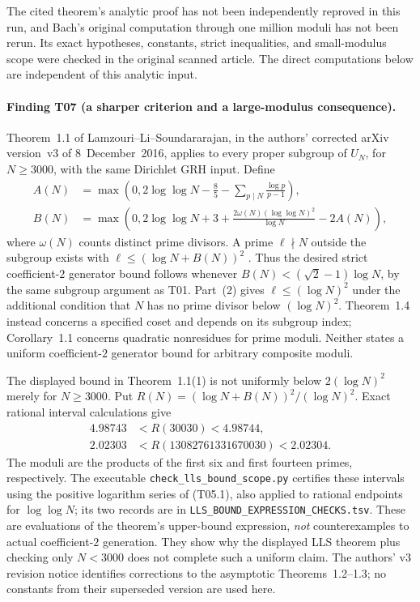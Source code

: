 \documentclass[11pt,a4paper]{article}
\begin{document}
The cited theorem's analytic proof has not been independently reproved
in this run, and Bach's original computation through one million moduli
has not been rerun. Its exact hypotheses, constants, strict inequalities,
and small-modulus scope were checked in the original scanned article.
The direct computations below are independent of this analytic input.

\paragraph{Finding T07 (a sharper criterion and a large-modulus consequence).}
Theorem~1.1 of Lamzouri--Li--Soundararajan, in the authors' corrected
arXiv version~v3 of 8~December~2016, applies to every proper subgroup
of $U_N$, for $N\geq3000$, with the same Dirichlet GRH input.
Define
\[
 \begin{split}
 A(N)&=\max\left(0,2\log\log N-\frac85
                    -\sum_{p\mid N}\frac{\log p}{p-1}\right),\\
 B(N)&=\max\left(0,2\log\log N+3
          +\frac{2\omega(N)(\log\log N)^2}{\log N}-2A(N)\right),
 \end{split}
\]
where $\omega(N)$ counts distinct prime divisors. A prime $\ell\nmid N$
outside the subgroup exists with
$\ell\leq(\log N+B(N))^2$
\cite[Theorem~1.1(1), corrected arXiv version~v3]{LLS2015}.
Thus the desired strict coefficient-$2$ generator bound follows
whenever $B(N)<(\sqrt2-1)\log N$, by the same subgroup argument as
T01. Part~(2) gives $\ell\leq(\log N)^2$ under the additional
condition that $N$ has no prime divisor below $(\log N)^2$.
Theorem~1.4 instead concerns a specified coset and depends on its
subgroup index; Corollary~1.1 concerns quadratic nonresidues for prime
moduli. Neither states a uniform coefficient-$2$ generator bound for
arbitrary composite moduli.

The displayed bound in Theorem~1.1(1) is not uniformly below
$2(\log N)^2$ merely for $N\geq3000$. Put
$R(N)=(\log N+B(N))^2/(\log N)^2$. Exact rational interval calculations
give
\[
 \begin{split}
 4.98743&<R(30030)<4.98744,\\
 2.02303&<R(13082761331670030)<2.02304.
 \end{split}
\]
The moduli are the products of the first six and first fourteen primes,
respectively. The executable \texttt{check\_lls\_bound\_scope.py}
certifies these intervals using the positive logarithm series of
(T05.1), also applied to rational endpoints for $\log\log N$;
its two records are in \texttt{LLS\_BOUND\_EXPRESSION\_CHECKS.tsv}.
These are evaluations of the theorem's upper-bound expression,
\emph{not} counterexamples to actual coefficient-$2$ generation.
They show why the displayed LLS theorem plus checking only $N<3000$
does not complete such a uniform claim. The authors' v3 revision notice
identifies corrections to the asymptotic Theorems~1.2--1.3; no constants
from their superseded version are used here.
\end{document}
